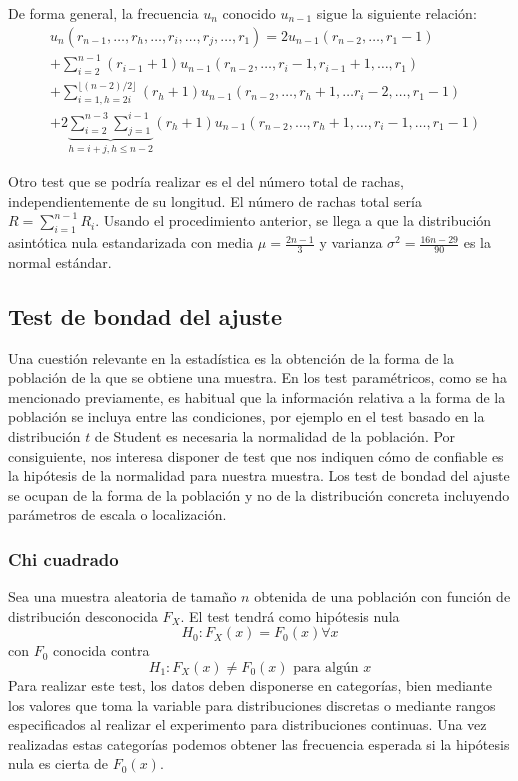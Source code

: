 	De forma general, la frecuencia $u_n$ conocido $u_{n-1}$ sigue la siguiente relación:
\begin{align*}
	& u_n (r_{n-1}, \dots, r_h, \dots, r_i, \dots, r_j, \dots, r_1)= 
		2 u_{n-1}(r_{n-2}, \dots, r_1-1) \\
	&+ \sum\limits_{i=2}^{n-1} 
		(r_{i-1} + 1)
		u_{n-1}(r_{n-2},\dots, r_i-1, r_{i-1}+1,\dots, r_1)\\
	&+ \sum\limits_{i=1, h=2i}^{\lfloor (n-2)/2 \rfloor} 
		(r_{h} + 1)
		u_{n-1}(r_{n-2},\dots, r_h+1,\dots r_i-2,\dots, r_1-1)\\
	&+ 2 \underbrace{\sum\limits_{i=2}^{n-3} \sum\limits_{j=1}^{i-1}}_{h=i+j, h \leq n-2}
		(r_{h} + 1)
		u_{n-1}(r_{n-2},\dots, r_h+1,\dots, r_i-1,\dots, r_1-1)			
\end{align*}
	
	Otro test que se podría realizar es el del número total de rachas, independientemente de su longitud. El número de rachas total sería $R = \sum\limits_{i=1}^{n-1} R_i$. Usando el procedimiento anterior, se llega a que la distribución asintótica nula estandarizada con media $\mu = \frac{2n-1}{3}$ y varianza $\sigma^2=\frac{16n-29}{90}$ es la normal estándar.
	
\subsection{Test de bondad del ajuste}

	Una cuestión relevante en la estadística es la obtención de la forma de la población de la que se obtiene una muestra. En los test paramétricos, como se ha mencionado previamente, es habitual que la información relativa a la forma de la población se incluya entre las condiciones, por ejemplo en el test basado en la distribución $t$ de Student es necesaria la normalidad de la población. Por consiguiente, nos interesa disponer de test que nos indiquen cómo de confiable es la hipótesis de la normalidad para nuestra muestra. Los test de bondad del ajuste se ocupan de la forma de la población y no de la distribución concreta incluyendo parámetros de escala o localización.
	
\subsubsection{Chi cuadrado}

	Sea una muestra aleatoria de tamaño $n$ obtenida de una población con función de distribución desconocida $F_X$. El test tendrá como hipótesis nula
		\[ H_0: F_X(x) = F_0(x) \forall x \]
	con $F_0$ conocida contra
		\[ H_1: F_X(x) \neq F_0(x) \text{ para algún }  x \]
	Para realizar este test, los datos deben disponerse en categorías, bien mediante los valores que toma la variable para distribuciones discretas o mediante rangos especificados al realizar el experimento para distribuciones continuas. Una vez realizadas estas categorías podemos obtener las frecuencia esperada si la hipótesis nula es cierta de $F_0(x)$.\\
	
